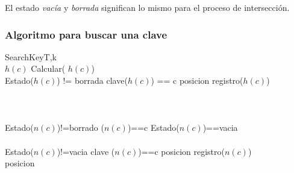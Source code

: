 \documentclass[10pt,a4paper,spanish]{report}
\begin{document}
\noindent
El estado \textit{\textcolor[rgb]{0.3,0.4,0.8}{vacía}} y \textit{\textcolor[rgb]{0.3,0.4,0.8}{borrada}} significan lo mismo para el proceso de intersección.

\subsubsection{\textcolor[rgb]{0.3,0.4,0.8}Algoritmo para buscar una clave}

\begin{pseudocode}{SearchKey}{T,k}
\label{SearchKey}
\\
$h(c)$ \GETS Calcular( $h(c)$) \\
\IF Estado($h(c)$) != borrada \AND clave($h(c)$) == c \THEN
\BEGIN
      posicion \GETS registro($h(c)$) \\
      \\
\END
\\
\\
\ELSEIF Estado($n(c)$)!=borrado \AND ($n(c)$)==c \OR Estado($n(c)$)==vacia \THEN
\BEGIN
{} \\
 \\
      \IF Estado($n(c)$)!=vacia \THEN
      \BEGIN
            \IF clave ($n(c)$)==c \THEN
            \BEGIN
                  posicion \GETS registro($n(c)$) \\
            \END
            \ELSE
            \BEGIN
                  posicion  \\
            \END
      \END
\END
\\
\end{pseudocode}
\end{document}
